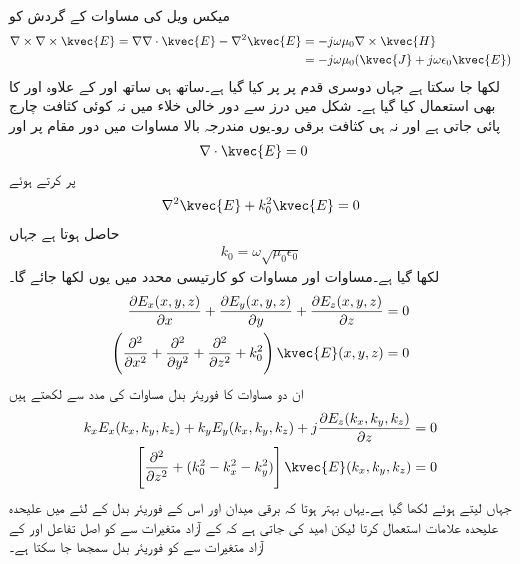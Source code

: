 میکس ویل کی مساوات  کے گردش کو
\begin{align*}
\nabla \times \nabla \times \kvec{E}=\nabla \nabla \cdot \kvec{E}-\nabla^2 \kvec{E}&=-j \omega \mu_0 \nabla \times \kvec{H} \\
&=-j \omega \mu_0 (\kvec{J}+j \omega \epsilon_0 \kvec{E})
\end{align*}
لکھا جا سکتا ہے جہاں دوسری قدم پر  پر کیا گیا ہے۔ساتھ ہی ساتھ  اور  کے علاوہ  اور 
 کا بھی استعمال کیا گیا ہے۔ شکل  میں درز سے دور خالی خلاء میں نہ کوئی کثافت چارج پائی جاتی ہے اور نہ ہی کثافت برقی رو۔یوں مندرجہ بالا مساوات میں دور مقام پر  اور  
\begin{align}\label{مساوات_اینٹینا_فوریئر_الف}
\nabla \cdot \kvec{E}&=0
\end{align}
پر کرتے ہوئے
\begin{align}\label{مساوات_اینٹینا_فوریئر_ب}
\nabla^2 \kvec{E}+k_0^2 \kvec{E}=0
\end{align}
حاصل ہوتا ہے جہاں
\begin{align}
k_0= \omega \sqrt{ \mu_0 \epsilon_0}
\end{align}
لکھا گیا ہے۔مساوات  اور مساوات  کو کارتیسی محدد میں یوں لکھا جائے گا۔
\begin{align}
\frac{\partial E_x(x,y,z)}{\partial x}+\frac{\partial E_y(x,y,z)}{\partial y}+\frac{\partial E_z(x,y,z)}{\partial z}&=0 \label{مساوات_اینٹینا_فوریئر_پ}\\
\left(\frac{\partial^2}{\partial x^2}+\frac{\partial^2}{\partial y^2}+\frac{\partial^2}{\partial z^2} +k_0^2\right) \kvec{E}(x,y,z)&=0\label{مساوات_اینٹینا_فوریئر_ت}
\end{align}
ان دو مساوات کا فوریئر بدل مساوات  کی مدد سے لکھتے ہیں
\begin{align}
k_x E_x(k_x,k_y,k_z)+k_y E_y(k_x,k_y,k_z)+j \frac{\partial E_z(k_x,k_y,k_z)}{\partial z}&=0\label{مساوات_اینٹینا_فوریئر_ٹ}\\
\left[\frac{\partial^2}{\partial z^2}+(k_0^2-k_x^2-k_y^2)\right] \kvec{E}(k_x,k_y,k_z)&=0\label{مساوات_اینٹینا_فوریئر_ث}
\end{align}
 جہاں  لیتے ہوئے  لکھا گیا ہے۔یہاں بہتر ہوتا کہ برقی میدان اور اس کے فوریئر بدل کے لئے میں علیحدہ علیحدہ علامات استعمال کرتا لیکن امید کی جاتی ہے کہ  کے آزاد متغیرات  سے  کو اصل تفاعل اور  کے آزاد متغیرات  سے    کو فوریئر بدل سمجھا جا سکتا ہے۔

